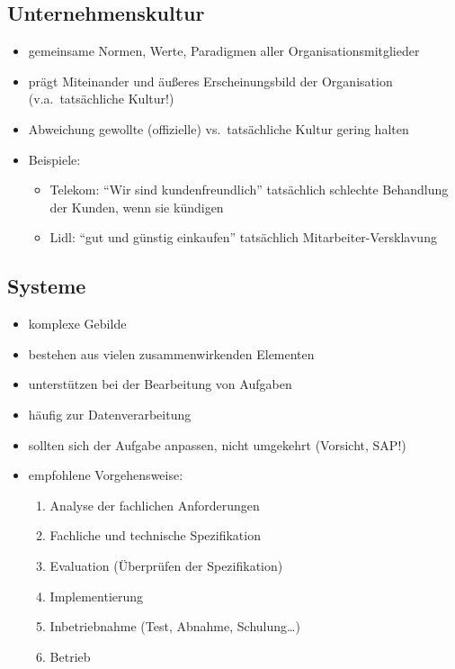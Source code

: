 \documentclass[a4paper, 12pt]{article}
\begin{document}
\subsection{Unternehmenskultur}
\begin{itemize}
  \item gemeinsame Normen, Werte, Paradigmen aller Organisationsmitglieder
  \item prägt Miteinander und äußeres Erscheinungsbild der Organisation (v.a.\ tatsächliche Kultur!)
  \item Abweichung gewollte (offizielle) vs.\ tatsächliche Kultur gering halten
  \item Beispiele:
    \begin{itemize}
      \item Telekom: ``Wir sind kundenfreundlich'' tatsächlich schlechte Behandlung der Kunden, wenn sie kündigen
      \item Lidl: ``gut und günstig einkaufen'' tatsächlich Mitarbeiter-Versklavung
    \end{itemize}
\end{itemize}


\subsection{Systeme}
\begin{itemize}
  \item komplexe Gebilde
  \item bestehen aus vielen zusammenwirkenden Elementen
  \item unterstützen bei der Bearbeitung von Aufgaben
  \item häufig zur Datenverarbeitung
  \item sollten sich der Aufgabe anpassen, nicht umgekehrt (Vorsicht, SAP!)
  \item empfohlene Vorgehensweise:
    \begin{enumerate}
      \item Analyse der fachlichen Anforderungen
      \item Fachliche und technische Spezifikation
      \item Evaluation (Überprüfen der Spezifikation)
      \item Implementierung
      \item Inbetriebnahme (Test, Abnahme, Schulung\ldots)
      \item Betrieb
    \end{enumerate}
\end{itemize}
\end{document}
